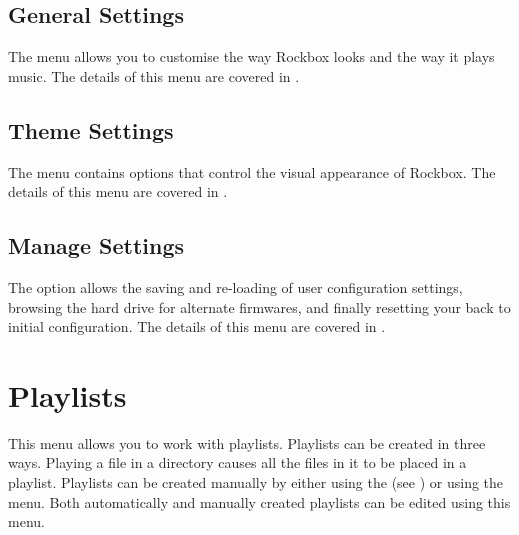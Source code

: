 \subsection{General Settings}
The  menu allows you to customise the way Rockbox looks 
and the way it plays music. The details of this menu are covered in
.

\subsection{Theme Settings}
The  menu contains options that control the visual
appearance of Rockbox. The details of this menu are covered in
.


\subsection{Manage Settings}
The  option allows the saving and re-loading of user 
configuration settings, browsing the hard drive for alternate firmwares, and finally
resetting your \dap{} back to initial configuration.
%
The details of this menu are covered in
.



\section{\label{ref:playlistoptions}Playlists}
  This menu allows you to work with playlists. Playlists can be created in 
  three ways. Playing a file in a directory causes all the files in it
  to be placed in a playlist. Playlists can be created manually by
  either using the   (see ) or using
  the  menu. Both automatically and manually created
  playlists can be edited using this menu.

